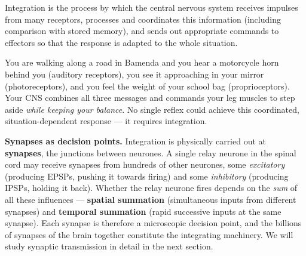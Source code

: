 \documentclass[11pt]{article}
\newcommand{\cle}[1]{{\popxbold\color{popdark}#1}}
\begin{document}
\begin{definition}[Integration]
\cle{Integration} is the process by which the central nervous system receives impulses from many receptors, processes and coordinates this information (including comparison with stored memory), and sends out appropriate commands to effectors so that the response is adapted to the whole situation.
\end{definition}

\begin{exemplebox}
You are walking along a road in Bamenda and you hear a motorcycle horn behind you (auditory receptors), you see it approaching in your mirror (photoreceptors), and you feel the weight of your school bag (proprioceptors). Your CNS combines all three messages and commands your leg muscles to step aside \emph{while keeping your balance}. No single reflex could achieve this coordinated, situation-dependent response — it requires integration.
\end{exemplebox}

\textbf{Synapses as decision points.} Integration is physically carried out at \textbf{synapses}, the junctions between neurones. A single relay neurone in the spinal cord may receive synapses from hundreds of other neurones, some \emph{excitatory} (producing EPSPs, pushing it towards firing) and some \emph{inhibitory} (producing IPSPs, holding it back). Whether the relay neurone fires depends on the \emph{sum} of all these influences — \textbf{spatial summation} (simultaneous inputs from different synapses) and \textbf{temporal summation} (rapid successive inputs at the same synapse). Each synapse is therefore a microscopic decision point, and the billions of synapses of the brain together constitute the integrating machinery. We will study synaptic transmission in detail in the next section.
\end{document}
